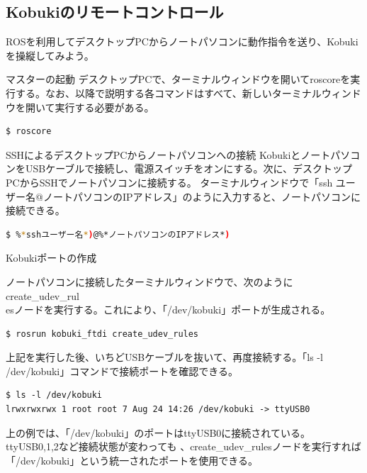 \begin{itemize}
\section{Kobukiのリモートコントロール}

\setcounter{num}{0}

ROSを利用してデスクトップPCからノートパソコンに動作指令を送り、Kobukiを操縦してみよう。

\circled{\thenum} マスターの起動
デスクトップPCで、ターミナルウィンドウを開いてroscoreを実行する。なお、以降で説明する各コマンドはすべて、新しいターミナルウィンドウを開いて実行する必要がある。

\begin{lstlisting}[language=ROS]
$ roscore
\end{lstlisting}

\circled{\thenum} SSHによるデスクトップPCからノートパソコンへの接続
KobukiとノートパソコンをUSBケーブルで接続し、電源スイッチをオンにする。次に、デスクトップPCからSSHでノートパソコンに接続する。  ターミナルウィンドウで「ssh ユーザー名@ノートパソコンのIPアドレス」のように入力すると、ノートパソコンに接続できる。

\begin{lstlisting}[language=bash]
$ %*sshユーザー名*)@%*ノートパソコンのIPアドレス*)
\end{lstlisting}

\circled{\thenum} Kobukiポートの作成

ノートパソコンに接続したターミナルウィンドウで、次のようにcreate\_udev\_rul\\esノードを実行する。これにより、「/dev/kobuki」ポートが生成される。

\begin{lstlisting}[language=ROS]
$ rosrun kobuki_ftdi create_udev_rules
\end{lstlisting}


上記を実行した後、いちどUSBケーブルを抜いて、再度接続する。「ls -l  /dev/kobuki」コマンドで接続ポートを確認できる。

\begin{lstlisting}[language=ROS]
$ ls -l /dev/kobuki
lrwxrwxrwx 1 root root 7 Aug 24 14:26 /dev/kobuki -> ttyUSB0
\end{lstlisting}


上の例では、「/dev/kobuki」のポートはttyUSB0に接続されている。ttyUSB0,1,2など接続状態が変わっても   、create\_udev\_rulesノードを実行すれば「/dev/kobuki」という統一されたポートを使用できる。


\end{itemize}

